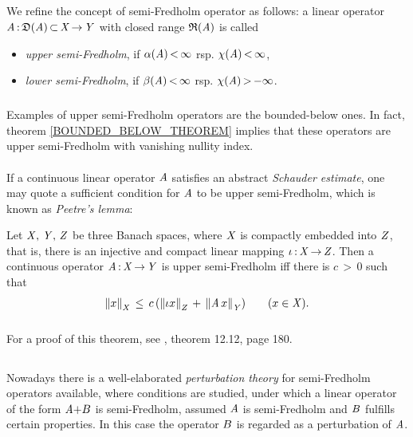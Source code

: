 \documentclass[11pt,twoside]{article}
\begin{document}
\subparagraph{} %
We refine the concept of semi-Fredholm operator as follows:
a linear operator $\mathit{A} {\,:\,} \mathfrak{D}(\mathit{A}) {\,\subset\,} \mathit{X} {\,\to\,} \mathit{Y}$
with closed range $\mathfrak{R}(\mathit{A})$ is called

\begin{itemize}[leftmargin=12mm]
\item[(F-3)]
\textit{upper semi-Fredholm},
if $\alpha(\mathit{A}) {\,<\,} \infty$ rsp. $\chi(\mathit{A}) {\,<\,} \infty$,

\item[(F-4)]
\textit{lower semi-Fredholm},
if $\beta(\mathit{A}) {\,<\,} \infty$ rsp. $\chi(\mathit{A}) {\,>\,} {-}\infty$.
\end{itemize}

\subparagraph{} %
Examples of upper semi-Fredholm operators are the bounded-below ones.
In fact,
theorem \ref{BOUNDED_BELOW_THEOREM} implies that
these operators are upper semi-Fredholm with vanishing nullity index.

\paragraph{} %
If a continuous linear operator $\mathit{A}$ satisfies
an abstract \textit{Schauder estimate},
one may quote a sufficient condition for $\mathit{A}$ to be upper semi-Fredholm,
which is known as \textit{Peetre}\textit{'s lemma}:

\begin{theorem}\label{PEETRE_THEOREM}
Let $\mathit{X},\,\mathit{Y},\,\mathit{Z}$ be three Banach spaces,
where $\mathit{X}$ is compactly embedded into $\mathit{Z}$,
that is,
there is an injective and compact linear mapping $\iota {\,:\,} \mathit{X} {\,\to\,} \mathit{Z}$.
Then a continuous operator $\mathit{A} {\,:\,} \mathit{X} {\,\to\,} \mathit{Y}$ is upper semi-Fredholm
iff there is $c {\,>\,} 0$ such that
\[
\left\lVert x \right\rVert_{\mathit{X}} \, \leq \,
c \, (\left\lVert \iota x \right\rVert_{\mathit{Z}} \,+\, \left\lVert \mathit{A} \,x \right\rVert_{\mathit{Y}})
\quad \quad (x \in \mathit{X}).
\]
\end{theorem}

\subparagraph{}
For a proof of this theorem, see \cite{Wl}, theorem 12.12, page 180.

\subsection{} %
Nowadays there is a well-elaborated \textit{perturbation theory}
for semi-Fredholm operators available,
where conditions are studied,
under which a linear operator of the form $\mathit{A} {+}{B}$ is semi-Fredholm,
assumed $\mathit{A}$ is semi-Fredholm and ${B}$ fulfills certain properties.
In this case the operator ${B}$ is regarded as a perturbation of $\mathit{A}$.
\end{document}
